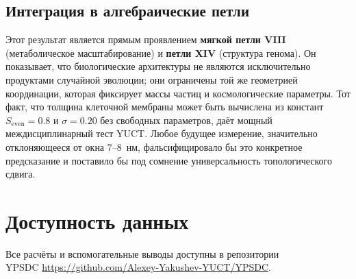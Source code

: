 \documentclass[12pt,a4paper]{article}
\begin{document}
	\subsection*{Интеграция в алгебраические петли}
	
	Этот результат является прямым проявлением \textbf{мягкой петли VIII} (метаболическое масштабирование) и \textbf{петли XIV} (структура генома). Он показывает, что биологические архитектуры не являются исключительно продуктами случайной эволюции; они ограничены той же геометрией координации, которая фиксирует массы частиц и космологические параметры. Тот факт, что толщина клеточной мембраны может быть вычислена из констант \(S_{\mathrm{even}} = 0.8\) и \(\sigma = 0.20\) без свободных параметров, даёт мощный междисциплинарный тест YUCT. Любое будущее измерение, значительно отклоняющееся от окна 7–8~нм, фальсифицировало бы это конкретное предсказание и поставило бы под сомнение универсальность топологического сдвига.
	
	\section*{Доступность данных}
	Все расчёты и вспомогательные выводы доступны в репозитории \\ YPSDC \url{https://github.com/Alexey-Yakushev-YUCT/YPSDC}.
	
\end{document}
